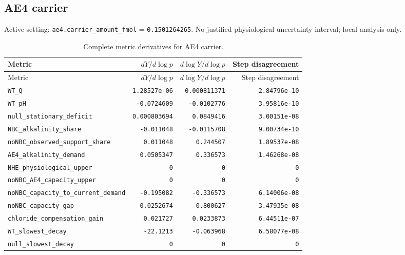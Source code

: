 \subsection*{AE4 carrier}
Active setting: \nolinkurl{ae4.carrier_amount_fmol} = \texttt{0.1501264265}. No justified physiological uncertainty interval; local analysis only.


\begingroup\scriptsize
\setlength{\tabcolsep}{3pt}
\begin{longtable}{p{.44\linewidth}rrr}
\caption{Complete metric derivatives for AE4 carrier.}\\
\toprule
Metric & $dY/d\log p$ & $d\log Y/d\log p$ & Step disagreement \\
\midrule\endfirsthead
\toprule
Metric & $dY/d\log p$ & $d\log Y/d\log p$ & Step disagreement \\
\midrule\endhead
\bottomrule\endfoot
\nolinkurl{WT_Q} & \texttt{1.28527e-06} & \texttt{0.000811371} & \texttt{2.84796e-10} \\
\nolinkurl{WT_pH} & \texttt{-0.0724609} & \texttt{-0.0102776} & \texttt{3.95816e-10} \\
\nolinkurl{null_stationary_deficit} & \texttt{0.000803694} & \texttt{0.0849416} & \texttt{3.00151e-08} \\
\nolinkurl{NBC_alkalinity_share} & \texttt{-0.011048} & \texttt{-0.0115708} & \texttt{9.00734e-10} \\
\nolinkurl{noNBC_observed_support_share} & \texttt{0.011048} & \texttt{0.244507} & \texttt{1.89537e-08} \\
\nolinkurl{AE4_alkalinity_demand} & \texttt{0.0505347} & \texttt{0.336573} & \texttt{1.46268e-08} \\
\nolinkurl{NHE_physiological_upper} & \texttt{0} & \texttt{0} & \texttt{0} \\
\nolinkurl{noNBC_AE4_capacity_upper} & \texttt{0} & \texttt{0} & \texttt{0} \\
\nolinkurl{noNBC_capacity_to_current_demand} & \texttt{-0.195082} & \texttt{-0.336573} & \texttt{6.14006e-08} \\
\nolinkurl{noNBC_capacity_gap} & \texttt{0.0252674} & \texttt{0.800627} & \texttt{3.47935e-08} \\
\nolinkurl{chloride_compensation_gain} & \texttt{0.021727} & \texttt{0.0233873} & \texttt{6.44511e-07} \\
\nolinkurl{WT_slowest_decay} & \texttt{-22.1213} & \texttt{-0.063968} & \texttt{6.58077e-08} \\
\nolinkurl{null_slowest_decay} & \texttt{0} & \texttt{0} & \texttt{0} \\
\end{longtable}
\endgroup

